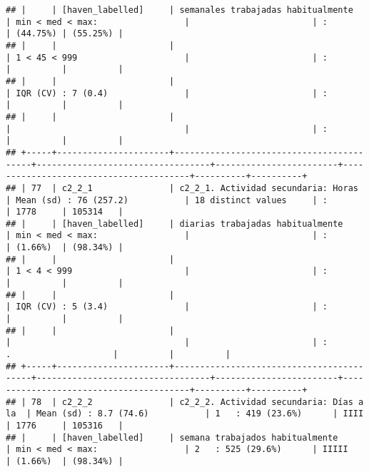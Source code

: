 \documentclass[]{article}
\begin{document}
\begin{verbatim}
## |     | [haven_labelled]     | semanales trabajadas habitualmente       | min < med < max:                 |                        | :                                      | (44.75%) | (55.25%) |
## |     |                      |                                          | 1 < 45 < 999                     |                        | :                                      |          |          |
## |     |                      |                                          | IQR (CV) : 7 (0.4)               |                        | :                                      |          |          |
## |     |                      |                                          |                                  |                        | :                                      |          |          |
## +-----+----------------------+------------------------------------------+----------------------------------+------------------------+----------------------------------------+----------+----------+
## | 77  | c2_2_1               | c2_2_1. Actividad secundaria: Horas      | Mean (sd) : 76 (257.2)           | 18 distinct values     | :                                      | 1778     | 105314   |
## |     | [haven_labelled]     | diarias trabajadas habitualmente         | min < med < max:                 |                        | :                                      | (1.66%)  | (98.34%) |
## |     |                      |                                          | 1 < 4 < 999                      |                        | :                                      |          |          |
## |     |                      |                                          | IQR (CV) : 5 (3.4)               |                        | :                                      |          |          |
## |     |                      |                                          |                                  |                        | :                 .                    |          |          |
## +-----+----------------------+------------------------------------------+----------------------------------+------------------------+----------------------------------------+----------+----------+
## | 78  | c2_2_2               | c2_2_2. Actividad secundaria: Días a la  | Mean (sd) : 8.7 (74.6)           | 1   : 419 (23.6%)      | IIII                                   | 1776     | 105316   |
## |     | [haven_labelled]     | semana trabajados habitualmente          | min < med < max:                 | 2   : 525 (29.6%)      | IIIII                                  | (1.66%)  | (98.34%) |

\end{verbatim}
\end{document}
